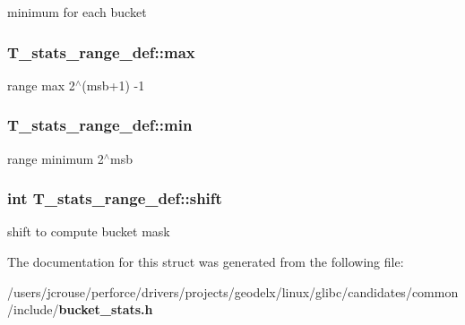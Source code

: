 minimum for each bucket 
\subsubsection{ T\_\-stats\_\-range\_\-def::max}\label{structT__stats__range__def_m1}


range max 2$^\wedge$(msb+1) -1 
\subsubsection{ T\_\-stats\_\-range\_\-def::min}\label{structT__stats__range__def_m0}


range minimum 2$^\wedge$msb 
\subsubsection{\setlength{\rightskip}{0pt plus 5cm}int T\_\-stats\_\-range\_\-def::shift}\label{structT__stats__range__def_m2}


shift to compute bucket mask 

The documentation for this struct was generated from the following file:\begin{CompactItemize}
\item 
/users/jcrouse/perforce/drivers/projects/geodelx/linux/glibc/candidates/common/include/{\bf bucket\_\-stats.h}\end{CompactItemize}
